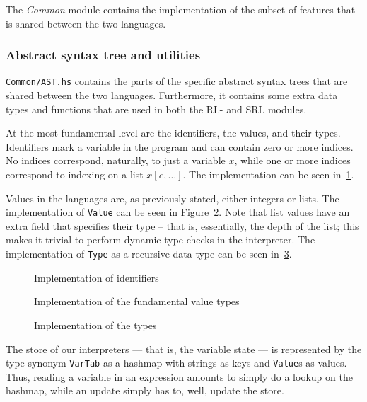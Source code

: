

The \textit{Common} module contains the implementation of the subset of features that is shared between the two languages.

\subsubsection{Abstract syntax tree and utilities}
\texttt{Common/AST.hs} contains the parts of the specific abstract syntax trees that are shared between the two languages. Furthermore, it contains some extra data types and functions that are used in both the RL- and SRL modules.

At the most fundamental level are the identifiers, the values, and their types. Identifiers mark a variable in the program and can contain zero or more indices. No indices correspond, naturally, to just a variable $x$, while one or more indices correspond to indexing on a list $x[e,\dots]$. The implementation can be seen in~\ref{fig:identifier}.

Values in the languages are, as previously stated, either integers or lists. The implementation of \texttt{Value} can be seen in Figure~\ref{fig:val}. Note that list values have an extra field that specifies their type -- that is, essentially, the depth of the list; this makes it trivial to perform dynamic type checks in the interpreter. The implementation of \texttt{Type} as a recursive data type can be seen in~\ref{fig:type}.

\begin{figure}[H]
  
  \caption{Implementation of identifiers}\label{fig:identifier}
\end{figure}
\begin{figure}[H]
  
  \caption{Implementation of the fundamental value types}\label{fig:val}
\end{figure}
\begin{figure}[H]
  
  \caption{Implementation of the types}\label{fig:type}
\end{figure}

\noindent The store of our interpreters --- that is, the variable state --- is represented by the type synonym \texttt{VarTab} as a hashmap with strings as keys and \texttt{Value}s as values. Thus, reading a variable in an expression amounts to simply do a lookup on the hashmap, while an update simply has to, well, update the store.\\

